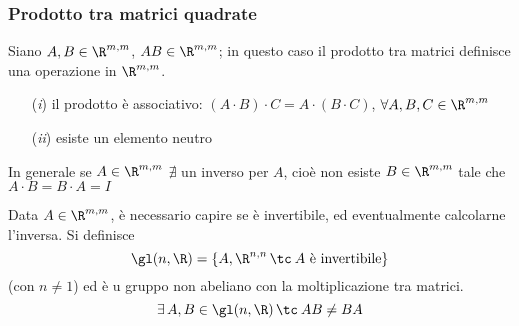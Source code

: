 \subsubsection{Prodotto tra matrici quadrate}

Siano $ A, B \in \R^{m,m} $, $ AB \in \R^{m,m} $; in questo caso il prodotto tra matrici definisce una operazione in $ \R^{m,m} $.
\begin{itemize}
	\item [(\textit{i})] il prodotto è associativo: $ (A\cdot B) \cdot C = A \cdot (B\cdot C) $, $ \forall A, B, C \in \R^{m,m} $
	\item [(\textit{ii})] esiste un elemento neutro
\end{itemize}


In generale se $ A \in \R^{m,m} $ $ \nexists $ un inverso per $ A $, cioè non esiste $ B \in \R^{m,m} $ tale che $ A \cdot B = B \cdot A = I $


Data $ A \in \R^{m,m} $, è necessario capire se è invertibile, ed eventualmente calcolarne l'inversa. Si definisce \begin{equation}
	\gl (n, \R)=\{A, \R^{n,n}\,\tc\: A\text{ è invertibile}\}
\end{equation}
(con $ n\neq 1 $) ed è u gruppo non abeliano con la moltiplicazione tra matrici. 
\[
	\exists\, A, B \in \gl(n, \R)\,\tc\: AB\neq BA
\]

